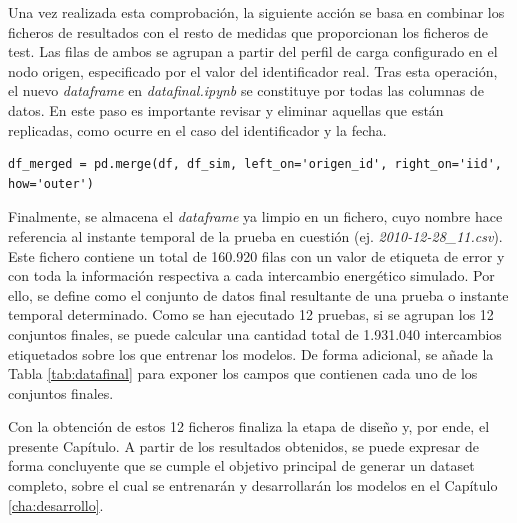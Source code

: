 \vspace{3mm}

Una vez realizada esta comprobación, la siguiente acción se basa en combinar los ficheros de resultados con el resto de medidas que proporcionan los ficheros de test. Las filas de ambos se agrupan a partir del perfil de carga configurado en el nodo origen, especificado por el valor del identificador real. Tras esta operación, el nuevo \textit{dataframe} en \textit{datafinal.ipynb} se constituye por todas las columnas de datos. En este paso es importante revisar y eliminar aquellas que están replicadas, como ocurre en el caso del identificador y la fecha. 

\vspace{3mm}

\begin{lstlisting}[style=Python, caption={Combinación de ficheros de resultados y de test}]
    df_merged = pd.merge(df, df_sim, left_on='origen_id', right_on='iid', how='outer')
\end{lstlisting}

\vspace{3mm}

Finalmente, se almacena el \textit{dataframe} ya limpio en un fichero, cuyo nombre hace referencia al instante temporal de la prueba en cuestión (ej. \textit{2010-12-28\_11.csv}). Este fichero contiene un total de 160.920 filas con un valor de etiqueta de error y con toda la información respectiva a cada intercambio energético simulado. Por ello, se define como el conjunto de datos final resultante de una prueba o instante temporal determinado. Como se han ejecutado 12 pruebas, si se agrupan los 12 conjuntos finales, se puede calcular una cantidad total de 1.931.040 intercambios etiquetados sobre los que entrenar los modelos. De forma adicional, se añade la Tabla \ref{tab:datafinal} para exponer los campos que contienen cada uno de los conjuntos finales.

\vspace{3mm}

Con la obtención de estos 12 ficheros finaliza la etapa de diseño y, por ende, el presente Capítulo. A partir de los resultados obtenidos, se puede expresar de forma concluyente que se cumple el objetivo principal de generar un dataset completo, sobre el cual se entrenarán y desarrollarán los modelos en el Capítulo \ref{cha:desarrollo}. 

